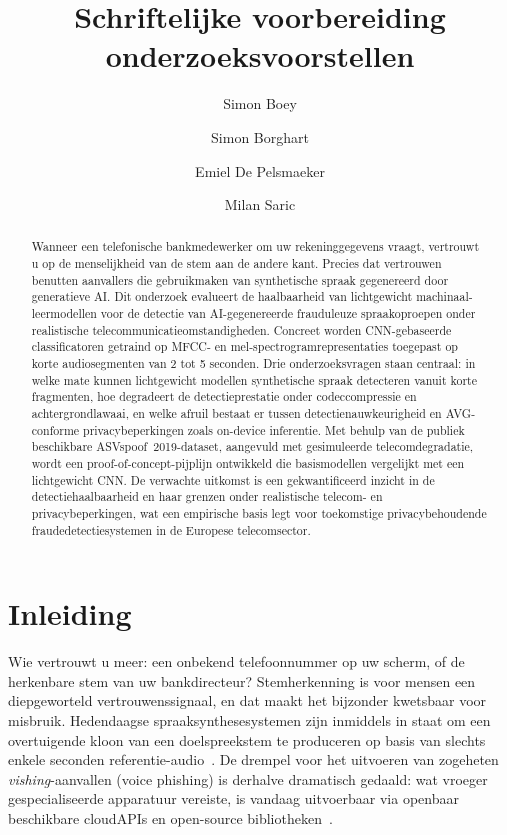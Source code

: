 \documentclass{hogent-article}
\title{Schriftelijke voorbereiding onderzoeksvoorstellen}
\author{Simon Boey}
\author{Simon Borghart}
\author{Emiel De Pelsmaeker}
\author{Milan Saric}
\begin{document}
\begin{abstract}
  Wanneer een telefonische bankmedewerker om uw rekeninggegevens vraagt, vertrouwt
  u op de menselijkheid van de stem aan de andere kant. Precies dat vertrouwen
  benutten aanvallers die gebruikmaken van synthetische spraak gegenereerd door
  generatieve AI\@. Dit onderzoek evalueert de haalbaarheid van lichtgewicht
  machinaal-leermodellen voor de detectie van AI-gegenereerde frauduleuze
  spraakoproepen onder realistische telecommunicatieomstandigheden. Concreet
  worden CNN-gebaseerde classificatoren getraind op MFCC- en
  mel-spectrogramrepresentaties toegepast op korte audiosegmenten van 2 tot 5
  seconden. Drie onderzoeksvragen staan centraal: in welke mate kunnen
  lichtgewicht modellen synthetische spraak detecteren vanuit korte fragmenten,
  hoe degradeert de detectieprestatie onder codeccompressie en achtergrondlawaai,
  en welke afruil bestaat er tussen detectienauwkeurigheid en
  AVG-conforme privacybeperkingen zoals on-device inferentie. Met behulp van
  de publiek beschikbare ASVspoof~2019-dataset, aangevuld met gesimuleerde
  telecomdegradatie, wordt een proof-of-concept-pijplijn ontwikkeld die
  basismodellen vergelijkt met een lichtgewicht CNN\@. De verwachte uitkomst is
  een gekwantificeerd inzicht in de detectiehaalba\-arheid en haar grenzen onder
  realistische telecom- en privacybeperkingen, wat een empirische basis legt voor
  toekomstige privacybehoudende fraudedetectiesystemen in de Europese
  telecomsector.
\end{abstract}

\tableofcontents

\section{Inleiding}%
\label{sec:inleiding}

Wie vertrouwt u meer: een onbekend telefoonnummer op uw scherm, of de herkenbare
stem van uw bankdirecteur? Stemherkenning is voor mensen een diepgeworteld
vertrouwenssignaal, en dat maakt het bijzonder kwetsbaar voor misbruik.
Hedendaagse spraaksynthesesystemen zijn inmiddels in staat om een overtuigende
kloon van een doelspreekstem te produceren op basis van slechts enkele seconden
referentie-audio~\autocite{Azzuni2025}. De drempel voor het uitvoeren van
zogeheten \emph{vishing}-aanvallen (voice phishing) is derhalve dramatisch
gedaald: wat vroeger gespecialiseerde apparatuur vereiste, is vandaag uitvoerbaar
via openbaar beschikbare cloudAPIs en open-source bibliotheken~\autocite{Ruggiero2021}.
\end{document}
